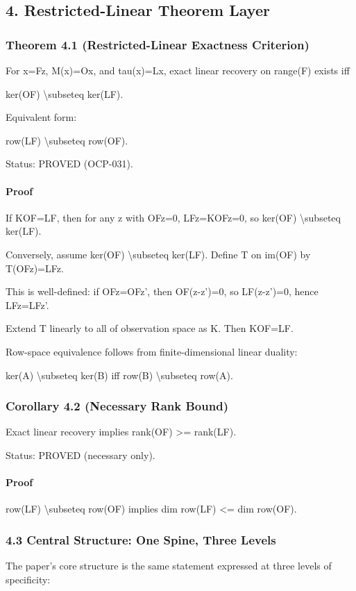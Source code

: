 \documentclass[11pt]{article}
\begin{document}
\subsection*{4. Restricted-Linear Theorem Layer}

\subsubsection*{Theorem 4.1 (Restricted-Linear Exactness Criterion)}
For x=Fz, M(x)=Ox, and tau(x)=Lx, exact linear recovery on range(F) exists iff


ker(OF) \textbackslash{}subseteq ker(LF).


Equivalent form:


row(LF) \textbackslash{}subseteq row(OF).


Status: PROVED (OCP-031).


\paragraph{Proof}
If KOF=LF, then for any z with OFz=0, LFz=KOFz=0, so ker(OF) \textbackslash{}subseteq ker(LF).


Conversely, assume ker(OF) \textbackslash{}subseteq ker(LF). Define T on im(OF) by T(OFz)=LFz.

This is well-defined: if OFz=OFz', then OF(z-z')=0, so LF(z-z')=0, hence LFz=LFz'.

Extend T linearly to all of observation space as K. Then KOF=LF.


Row-space equivalence follows from finite-dimensional linear duality:

ker(A) \textbackslash{}subseteq ker(B) iff row(B) \textbackslash{}subseteq row(A).


\subsubsection*{Corollary 4.2 (Necessary Rank Bound)}
Exact linear recovery implies rank(OF) >= rank(LF).


Status: PROVED (necessary only).


\paragraph{Proof}
row(LF) \textbackslash{}subseteq row(OF) implies dim row(LF) <= dim row(OF).


\subsubsection*{4.3 Central Structure: One Spine, Three Levels}
The paper's core structure is the same statement expressed at three levels of specificity:
\end{document}
